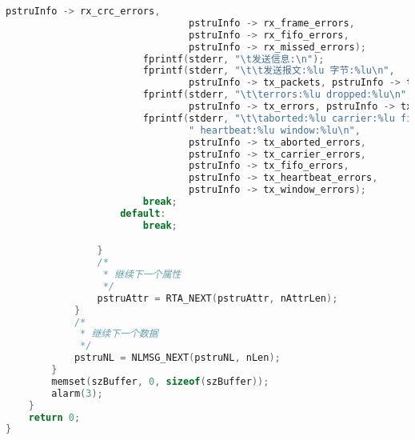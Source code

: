 \documentclass[a4paper,11pt,]{article}%
\begin{document}
\begin{appendices}
\begin{lstlisting}[language=C, caption= NetLink 获取网卡信息]
                                pstruInfo -> rx_crc_errors,
                                pstruInfo -> rx_frame_errors,
                                pstruInfo -> rx_fifo_errors,
                                pstruInfo -> rx_missed_errors);
                        fprintf(stderr, "\t发送信息:\n");
                        fprintf(stderr, "\t\t发送报文:%lu 字节:%lu\n",
                                pstruInfo -> tx_packets, pstruInfo -> tx_bytes);
                        fprintf(stderr, "\t\terrors:%lu dropped:%lu\n",
                                pstruInfo -> tx_errors, pstruInfo -> tx_dropped);
                        fprintf(stderr, "\t\taborted:%lu carrier:%lu fifo:%lu"
                                " heartbeat:%lu window:%lu\n",
                                pstruInfo -> tx_aborted_errors,
                                pstruInfo -> tx_carrier_errors,
                                pstruInfo -> tx_fifo_errors,
                                pstruInfo -> tx_heartbeat_errors,
                                pstruInfo -> tx_window_errors);
                        break;
                    default:
                        break;

                }
                /*
                 * 继续下一个属性
                 */
                pstruAttr = RTA_NEXT(pstruAttr, nAttrLen);
            }
            /*
             * 继续下一个数据
             */
            pstruNL = NLMSG_NEXT(pstruNL, nLen);
        }
        memset(szBuffer, 0, sizeof(szBuffer));
        alarm(3);
    }
    return 0;
}
\end{lstlisting}
\end{appendices}
\end{document}
